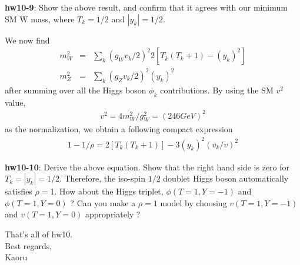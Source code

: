 \documentclass[12pt]{article}
\begin{document}
{\bf hw10-9}: Show the above result, and confirm that it agrees with our
  minimum SM W mass, where $T_k=1/2$ and $|y_k|=1/2$.

  We now find
\begin{eqnarray}
  m_W^2 &=& \sum_k (g_W v_k/2)^2 2 [ T_k(T_k+1) - (y_k)^2 ] \\
  m_Z^2 &=& \sum_k (g_Z v_k/2)^2 (y_k)^2
\end{eqnarray}
  after summing over all the Higgs boson $\phi_k$ contributions.
  By using the SM $v^2$ value,
\begin{eqnarray}
  v^2 = 4 m_W^2/g_W^2 = (246GeV)^2
\end{eqnarray}
  as the normalization, we obtain a following compact expression
\begin{eqnarray}
  1-1/\rho = 2 [T_k(T_k+1)]-3(y_k)^2 (v_k/v)^2
\end{eqnarray}

{\bf hw10-10}: Derive the above equation.  Show that the right hand side is
  zero for $T_k=|y_k|=1/2$.  Therefore, the iso-spin $1/2$ doublet Higgs
  boson automatically satisfies $\rho=1$.  How about the Higgs triplet,
  $\phi(T=1,Y=-1)$ and $\phi(T=1,Y=0)$ ?  Can you make a $\rho=1$ model by
  choosing $v(T=1,Y=-1)$ and $v(T=1,Y=0)$ appropriately ?

That's all of hw10.\\

Best regards,\\

Kaoru
\end{document}
